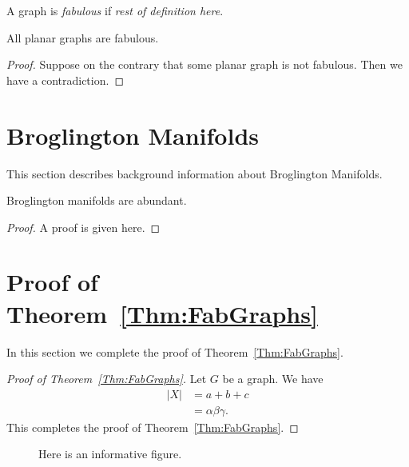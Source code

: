 \documentclass[12pt]{article}
\begin{document}
\begin{definition} 
  A graph is \emph{fabulous} if \emph{rest of definition here}.
\end{definition}

\begin{theorem}
  \label{Thm:FabGraphs}
  All planar graphs are fabulous.
\end{theorem}

\begin{proof}
  Suppose on the contrary that some planar graph is not fabulous.
  Then we have a contradiction.
\end{proof}

\section{Broglington Manifolds}

This section describes background information about Broglington
Manifolds.

\begin{lemma}
  \label{lem:Technical}
  Broglington manifolds are abundant.
\end{lemma}

\begin{proof}
  A proof is given here.
\end{proof}

\section{Proof of Theorem~\ref{Thm:FabGraphs}}

In this section we complete the proof of Theorem~\ref{Thm:FabGraphs}.

\begin{proof}[Proof of Theorem~\ref{Thm:FabGraphs}]
Let $G$ be a graph. We have
  \begin{align}
    |X| &= a+b+c \nonumber\\
         &= \alpha\beta\gamma.
  \end{align}
  This completes the proof of Theorem~\ref{Thm:FabGraphs}.
\end{proof}

\begin{figure}[ht]
  \centering
  \caption{Here is an informative figure.\label{fig:InformativeFigure}}
\end{figure}
\end{document}
